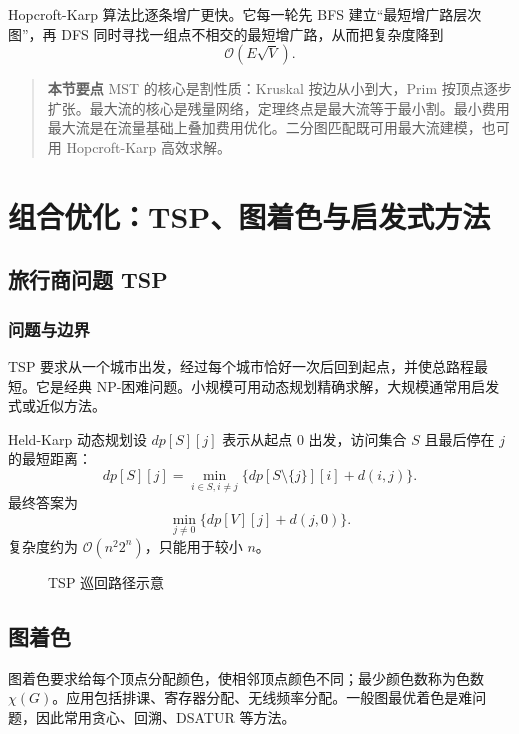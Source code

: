 \documentclass[UTF8,oneside,12pt]{ctexbook}
\newenvironment{summarybox}{\begin{quote}\small\noindent\textbf{本节要点}\quad}{\end{quote}}
\newcommand{\bigO}{\mathcal O}
\begin{document}
Hopcroft-Karp 算法比逐条增广更快。它每一轮先 BFS 建立“最短增广路层次图”，再 DFS 同时寻找一组点不相交的最短增广路，从而把复杂度降到
\[
\bigO(E\sqrt V).
\]

\begin{summarybox}
MST 的核心是割性质：Kruskal 按边从小到大，Prim 按顶点逐步扩张。最大流的核心是残量网络，定理终点是最大流等于最小割。最小费用最大流是在流量基础上叠加费用优化。二分图匹配既可用最大流建模，也可用 Hopcroft-Karp 高效求解。
\end{summarybox}

\chapter{组合优化：TSP、图着色与启发式方法}
\section{旅行商问题 TSP}
\subsection{问题与边界}
TSP 要求从一个城市出发，经过每个城市恰好一次后回到起点，并使总路程最短。它是经典 NP-困难问题。小规模可用动态规划精确求解，大规模通常用启发式或近似方法。

Held-Karp 动态规划设 $dp[S][j]$ 表示从起点 $0$ 出发，访问集合 $S$ 且最后停在 $j$ 的最短距离：
\[
dp[S][j]=\min_{i\in S, i\ne j}\{dp[S\setminus\{j\}][i]+d(i,j)\}.
\]
最终答案为
\[
\min_{j\ne0}\{dp[V][j]+d(j,0)\}.
\]
复杂度约为 $\bigO(n^2 2^n)$，只能用于较小 $n$。

\begin{figure}[htbp]
\centering
{}
\caption{TSP 巡回路径示意}
\end{figure}

\section{图着色}
图着色要求给每个顶点分配颜色，使相邻顶点颜色不同；最少颜色数称为色数 $\chi(G)$。应用包括排课、寄存器分配、无线频率分配。一般图最优着色是难问题，因此常用贪心、回溯、DSATUR 等方法。
\end{document}

